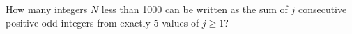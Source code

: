 How many integers $ N$ less than 1000 can be written as the sum of $ j$ consecutive positive odd integers from exactly 5 values of $ j\ge 1$?